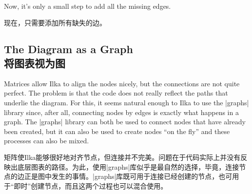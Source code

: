 %
\begin{codeexample}[preamble={\usetikzlibrary{shapes.misc}}]
\end{codeexample}
%
Now, it's only a small step to add all the missing edges.

现在，只需要添加所有缺失的边。


\subsection{The Diagram as a Graph\\将图表视为图}

Matrices allow Ilka to align the nodes nicely, but the connections are not
quite perfect. The problem is that the code does not really reflect the paths
that underlie the diagram. For this, it seems natural enough to Ilka to use the
|graphs| library since, after all, connecting nodes by edges is exactly what
happens in a graph. The |graphs| library can both be used to connect nodes that
have already been created, but it can also be used to create nodes ``on the
fly'' and these processes can also be mixed.

矩阵使Ilka能够很好地对齐节点，但连接并不完美。问题在于代码实际上并没有反映出底层图表的路径。为此，使用|graphs|库似乎是最自然的选择，毕竟，连接节点的边正是图中发生的事情。|graphs|库既可用于连接已经创建的节点，也可用于“即时”创建节点，而且这两个过程也可以混合使用。



